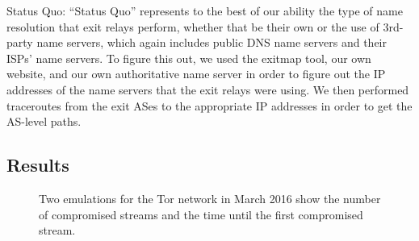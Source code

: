 Status Quo: ``Status Quo'' represents to the best of our ability the type of name resolution 
that exit relays perform, whether that be their own or the use of 3rd-party name servers, 
which again includes public DNS name servers and their ISPs' name servers. To figure this 
out, we used the exitmap tool, our own website, and our own authoritative name server 
in order to figure out the IP addresses of the name servers that the exit relays were 
using. We then performed traceroutes from the exit ASes to the appropriate IP addresses 
in order to get the AS-level paths.

\subsection{Results}

\begin{figure}[t]
\centering
{}
\caption{Two emulations for the Tor network in March 2016 show the
  number of compromised streams and the time until the first compromised
  stream.} 
\label{fig:compromise-stream-time}
\end{figure}

